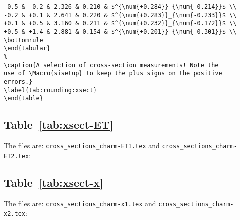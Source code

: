 \documentclass[UKenglish,texlive=2016]{\ATLASLATEXPATH atlasdoc}
\begin{document}
\begin{verbatim}
-0.5 & -0.2 & 2.326 & 0.210 & $^{\num{+0.284}}_{\num{-0.214}}$ \\
-0.2 & +0.1 & 2.641 & 0.220 & $^{\num{+0.283}}_{\num{-0.233}}$ \\
+0.1 & +0.5 & 3.160 & 0.211 & $^{\num{+0.232}}_{\num{-0.172}}$ \\
+0.5 & +1.4 & 2.881 & 0.154 & $^{\num{+0.201}}_{\num{-0.301}}$ \\
\bottomrule
\end{tabular}
%
\caption{A selection of cross-section measurements! Note the
use of \Macro{sisetup} to keep the plus signs on the positive
errors.}
\label{tab:rounding:xsect}
\end{table}
\end{verbatim}

\subsection{Table~\protect\ref{tab:xsect-ET}}
The files are: \texttt{cross\_sections\_charm-ET1.tex} and
\texttt{cross\_sections\_charm-ET2.tex}:
{\scriptsize
  
}
{\scriptsize
  
}

\subsection{Table~\protect\ref{tab:xsect-x}}

The files are: \texttt{cross\_sections\_charm-x1.tex} and
\texttt{cross\_sections\_charm-x2.tex}:
{\scriptsize
  
}
{\tiny
  
}
\end{document}
